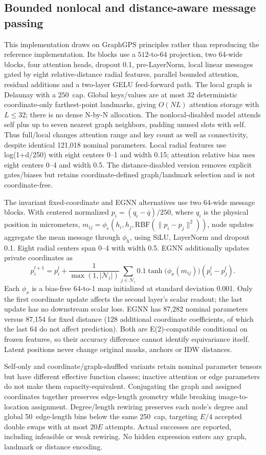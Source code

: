 \subsection{Bounded nonlocal and distance-aware message passing}
This implementation draws on GraphGPS principles rather than reproducing the reference implementation. Its blocks use a $512$-to-$64$ projection, two 64-wide blocks, four attention heads, dropout 0.1, pre-LayerNorm, local linear messages gated by eight relative-distance radial features, parallel bounded attention, residual additions and a two-layer GELU feed-forward path. The local graph is Delaunay with a $250$\,\um{} cap. Global keys/values are at most 32 deterministic coordinate-only farthest-point landmarks, giving $O(NL)$ attention storage with $L\leq32$; there is no dense N-by-N allocation. The nonlocal-disabled model attends self plus up to seven nearest graph neighbors, padding unused slots with self. Thus full/local changes attention range and key count as well as connectivity, despite identical 121,018 nominal parameters. Local radial features use log(1+d/250) with eight centers 0--1 and width 0.15; attention relative bias uses eight centers 0--4 and width 0.5. The distance-disabled version removes explicit gates/biases but retains coordinate-defined graph/landmark selection and is not coordinate-free.

The invariant fixed-coordinate and EGNN alternatives use two 64-wide message blocks. With centered normalized $p_i=(q_i-\overline q)/250$, where $q_i$ is the physical position in micrometers, $m_{ij}=\phi_e(h_i,h_j,\mathrm{RBF}(\|p_i-p_j\|^2))$, node updates aggregate the mean message through $\phi_h$, using SiLU, LayerNorm and dropout 0.1. Eight radial centers span 0--4 with width 0.5. EGNN additionally updates private coordinates as
\[
p_i^{l+1}=p_i^l+\frac{1}{\max(1,|\mathcal N_i|)}\sum_{j\in\mathcal N_i}0.1\tanh\!\big(\phi_x(m_{ij})\big)(p_i^l-p_j^l).
\]
Each $\phi_x$ is a bias-free 64-to-1 map initialized at standard deviation 0.001. Only the first coordinate update affects the second layer's scalar readout; the last update has no downstream scalar loss. EGNN has 87,282 nominal parameters versus 87,154 for fixed distance (128 additional coordinate coefficients, of which the last 64 do not affect prediction). Both are E(2)-compatible conditional on frozen features, so their accuracy difference cannot identify equivariance itself. Latent positions never change original masks, anchors or IDW distances.

Self-only and coordinate/graph-shuffled variants retain nominal parameter tensors but have different effective function classes; inactive attention or edge parameters do not make them capacity-equivalent. Conjugating the graph and assigned coordinates together preserves edge-length geometry while breaking image-to-location assignment. Degree/length rewiring preserves each node's degree and global 50\,\um{} edge-length bins below the same 250\,\um{} cap, targeting $E/4$ accepted double swaps with at most $20E$ attempts. Actual successes are reported, including infeasible or weak rewiring. No hidden expression enters any graph, landmark or distance encoding.


